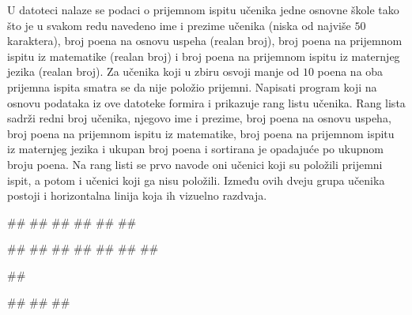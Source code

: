 \begin{Exercise}[label=705]
  U datoteci  nalaze se podaci o prijemnom ispitu učenika jedne osnovne škole tako što je u svakom redu navedeno ime i prezime učenika (niska od najviše $50$ karaktera), broj poena na osnovu uspeha (realan broj), broj poena na prijemnom ispitu iz matematike (realan broj) i broj poena na prijemnom ispitu iz maternjeg jezika (realan broj). Za učenika koji u zbiru osvoji manje od $10$ poena na oba prijemna ispita smatra se da nije položio prijemni. Napisati program koji na osnovu podataka iz ove datoteke formira i prikazuje rang listu učenika. Rang lista sadrži redni broj učenika, njegovo ime i prezime, broj poena na osnovu uspeha, broj poena na prijemnom ispitu iz matematike, broj poena na prijemnom ispitu iz maternjeg jezika i ukupan broj poena i sortirana je opadajuće po ukupnom broju poena. Na rang listi se prvo navode oni učenici koji su položili prijemni ispit, a potom i učenici koji ga nisu položili. Između ovih dveju grupa učenika postoji i horizontalna linija koja ih vizuelno razdvaja.

\begin{miditest}
\begin{test}{1}
##
##
##       
##         
##
##
  
#\naslovIzlaz#
##
##
##
##
#\izlaz{-----------------------------------}#
##
\end{test}
\end{miditest}
\begin{miditest}
\begin{test}{2}
##  

#\naslovIzlaz#
##
##
\end{test}
\end{miditest}

\end{Exercise}
\begin{Answer}[ref=705]
\end{Answer}

